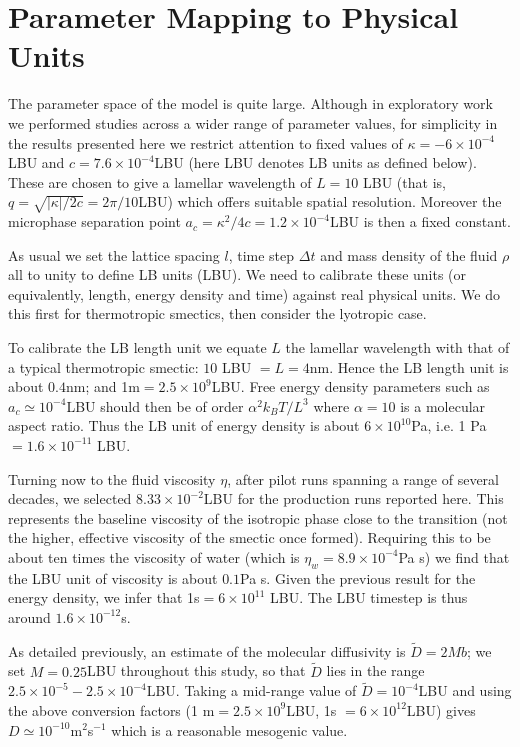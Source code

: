 \documentclass[8.5pt,twoside,twocolumn]{article}
\begin{document}
\section{Parameter Mapping to Physical Units}
\label{parametermap}

The parameter space of the model is quite large. Although in exploratory work we performed studies across a wider range of parameter values, for simplicity in the results presented here we restrict attention to fixed values of $\kappa = -6\times 10^{-4}$LBU and $c = 7.6\times 10^{-4}$LBU (here LBU denotes LB units as defined below). These are chosen to give a lamellar wavelength of $L = 10$ LBU (that is, $q = \sqrt{|\kappa|/2c} = 2\pi/10$LBU) which offers suitable spatial resolution. Moreover the microphase separation point $a_c = \kappa^2/4c = 1.2\times 10^{-4}$LBU is then a fixed constant. 

As usual we set the lattice spacing $l$, time step $\Delta t$ and mass density of the fluid $\rho$ all to unity to define LB units (LBU). We need to calibrate these units (or equivalently, length, energy density and time) against real physical units. We do this first for thermotropic smectics, then consider the lyotropic case.

To calibrate the LB length unit we equate $L$ the lamellar wavelength with that of a typical thermotropic smectic: $10$ LBU $= L = 4$nm. Hence the LB length unit is about $0.4$nm; and 1m$= 2.5\times 10^{9}$LBU. Free energy density parameters such as $a_c \simeq 10^{-4}$LBU should then be of order $\alpha^2k_BT/L^3$ where $\alpha =10$ is a molecular aspect ratio. Thus the LB unit of energy density is about $6\times 10^{10}$Pa, i.e. 1 Pa$= 1.6 \times 10^{-11}$ LBU.  

Turning now to the fluid viscosity $\eta$, after pilot runs spanning a range of several decades, we selected $8.33\times 10^{-2}$LBU for the production runs reported here. This represents the baseline viscosity of the isotropic phase close to the transition (not the higher, effective viscosity of the smectic once formed). Requiring this to be about ten times the viscosity of water (which is $\eta_w = 8.9\times 10^{-4}$Pa s) we find that the LBU unit of viscosity is about $0.1$Pa s. Given the previous result for the energy density, we infer that 1s$= 6\times 10^{11}$ LBU. The LBU timestep is thus around $1.6\times 10^{-12}$s. 

As detailed previously, an estimate of the molecular diffusivity is $\tilde D = 2Mb$; we set $M = 0.25$LBU throughout this study, so that $\tilde D$ lies in the range $2.5\times 10^{-5} - 2.5\times 10^{-4}$LBU. Taking a mid-range value of  $\tilde D = 10^{-4}$LBU and using the above conversion factors (1 m$= 2.5\times 10^9$LBU, 1s $= 6\times 10^{12}$LBU) gives $D\simeq 10^{-10}$m$^2$s$^{-1}$ which is a reasonable mesogenic value.
\end{document}
